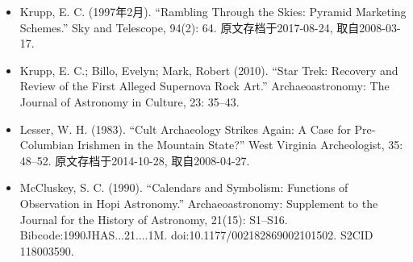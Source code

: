 \begin{itemize}
    \item Krupp, E. C. (1997年2月). “Rambling Through the Skies: Pyramid Marketing Schemes.” Sky and Telescope, 94(2): 64. 原文存档于2017-08-24, 取自2008-03-17.
    \item Krupp, E. C.; Billo, Evelyn; Mark, Robert (2010). “Star Trek: Recovery and Review of the First Alleged Supernova Rock Art.” Archaeoastronomy: The Journal of Astronomy in Culture, 23: 35–43.
    \item Lesser, W. H. (1983). “Cult Archaeology Strikes Again: A Case for Pre-Columbian Irishmen in the Mountain State?” West Virginia Archeologist, 35: 48–52. 原文存档于2014-10-28, 取自2008-04-27.
    \item McCluskey, S. C. (1990). “Calendars and Symbolism: Functions of Observation in Hopi Astronomy.” Archaeoastronomy: Supplement to the Journal for the History of Astronomy, 21(15): S1–S16. Bibcode:1990JHAS...21....1M. doi:10.1177/002182869002101502. S2CID 118003590.
\end{itemize}




